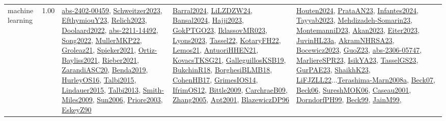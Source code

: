 {\begin{longtable}{p{3cm}r>{\raggedright\arraybackslash}p{6cm}>{\raggedright\arraybackslash}p{6cm}>{\raggedright\arraybackslash}p{8cm}}
\index{machine learning}\index{Algorithms!machine learning}machine learning &  1.00 & \hyperref[detail:abs-2402-00459]{abs-2402-00459}, \hyperref[detail:Schweitzer2023]{Schweitzer2023}, \hyperref[detail:EfthymiouY23]{EfthymiouY23}, \hyperref[detail:Relich2023]{Relich2023}, \hyperref[detail:Doolaard2022]{Doolaard2022}, \hyperref[detail:abs-2211-14492]{abs-2211-14492}, \hyperref[detail:Song2022]{Song2022}, \hyperref[detail:MullerMKP22]{MullerMKP22}, \hyperref[detail:Groleaz21]{Groleaz21}, \hyperref[detail:Spieker2021]{Spieker2021}, \hyperref[detail:Ortiz-Bayliss2021]{Ortiz-Bayliss2021}, \hyperref[detail:Rieber2021]{Rieber2021}, \hyperref[detail:ZarandiASC20]{ZarandiASC20}, \hyperref[detail:Benda2019]{Benda2019}, \hyperref[detail:HurleyOS16]{HurleyOS16}, \hyperref[detail:Talbi2015]{Talbi2015}, \hyperref[detail:Lindauer2015]{Lindauer2015}, \hyperref[detail:Talbi2013]{Talbi2013}, \hyperref[detail:Smith-Miles2009]{Smith-Miles2009}, \hyperref[detail:Sun2006]{Sun2006}, \hyperref[detail:Priore2003]{Priore2003}, \hyperref[detail:EskeyZ90]{EskeyZ90} & \hyperref[detail:Barral2024]{Barral2024}, \hyperref[detail:LiLZDZW24]{LiLZDZW24}, \hyperref[detail:Bansal2024]{Bansal2024}, \hyperref[detail:Hajji2023]{Hajji2023}, \hyperref[detail:GokPTGO23]{GokPTGO23}, \hyperref[detail:IklassovMR023]{IklassovMR023}, \hyperref[detail:Lyons2023]{Lyons2023}, \hyperref[detail:Tassel22]{Tassel22}, \hyperref[detail:KotaryFH22]{KotaryFH22}, \hyperref[detail:Lemos21]{Lemos21}, \hyperref[detail:AntuoriHHEN21]{AntuoriHHEN21}, \hyperref[detail:KovacsTKSG21]{KovacsTKSG21}, \hyperref[detail:GalleguillosKSB19]{GalleguillosKSB19}, \hyperref[detail:BukchinR18]{BukchinR18}, \hyperref[detail:BorghesiBLMB18]{BorghesiBLMB18}, \hyperref[detail:CohenHB17]{CohenHB17}, \hyperref[detail:GrimesIOS14]{GrimesIOS14}, \hyperref[detail:IfrimOS12]{IfrimOS12}, \hyperref[detail:Bittle2009]{Bittle2009}, \hyperref[detail:CarchraeB09]{CarchraeB09}, \hyperref[detail:Zhang2005]{Zhang2005}, \hyperref[detail:Apt2001]{Apt2001}, \hyperref[detail:BlazewiczDP96]{BlazewiczDP96} & \hyperref[detail:Houten2024]{Houten2024}, \hyperref[detail:PrataAN23]{PrataAN23}, \hyperref[detail:Infantes2024]{Infantes2024}, \hyperref[detail:Tayyab2023]{Tayyab2023}, \hyperref[detail:Mehdizadeh-Somarin23]{Mehdizadeh-Somarin23}, \hyperref[detail:MontemanniD23]{MontemanniD23}, \hyperref[detail:Akan2023]{Akan2023}, \hyperref[detail:Eiter2023]{Eiter2023}, \hyperref[detail:JuvinHL23a]{JuvinHL23a}, \hyperref[detail:AkramNHRSA23]{AkramNHRSA23}, \hyperref[detail:Bocewicz2023]{Bocewicz2023}, \hyperref[detail:GuoZ23]{GuoZ23}, \hyperref[detail:abs-2306-05747]{abs-2306-05747}, \hyperref[detail:MarliereSPR23]{MarliereSPR23}, \hyperref[detail:IsikYA23]{IsikYA23}, \hyperref[detail:TasselGS23]{TasselGS23}, \hyperref[detail:GurPAE23]{GurPAE23}, \hyperref[detail:ShaikhK23]{ShaikhK23}, \hyperref[detail:LiFJZLL22]{LiFJZLL22}...\hyperref[detail:Terashima-Marn2008a]{Terashima-Marn2008a}, \hyperref[detail:Beck07]{Beck07}, \hyperref[detail:Beck06]{Beck06}, \hyperref[detail:SureshMOK06]{SureshMOK06}, \hyperref[detail:Caseau2001]{Caseau2001}, \hyperref[detail:DorndorfPH99]{DorndorfPH99}, \hyperref[detail:Beck99]{Beck99}, \hyperref[detail:JainM99]{JainM99}, 
\end{longtable}}
